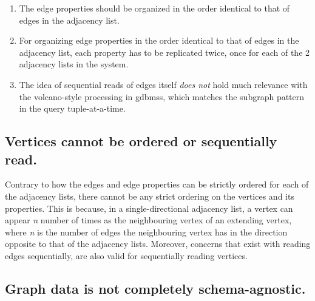 \begin{enumerate}
	
	\item The edge properties should be organized in the order identical to that of edges in the adjacency list.
	
	\item For organizing edge properties in the order identical to that of edges in the adjacency list, each property has to be replicated twice, once for each of the 2 adjacency lists in the system.
	
	\item The idea of sequential reads of edges itself \emph{does not} hold much relevance with the volcano-style processing in \gls{gdbms}s, which matches the subgraph pattern in the query tuple-at-a-time.
	
\end{enumerate}

\subsection{Vertices cannot be ordered or sequentially read.}
\label{ssec:vertices-unordered}

Contrary to how the edges and edge properties can be strictly ordered for each of the adjacency lists, there cannot be any strict ordering on the vertices and its properties. This is because, in a single-directional adjacency list, a vertex can appear \textit{n} number of times as the neighbouring vertex of an extending vertex, where \textit{n} is the number of edges the neighbouring vertex has in the direction opposite to that of the adjacency lists. Moreover, concerns that exist with reading edges sequentially, are also valid for sequentially reading vertices.

\subsection{Graph data is not completely schema-agnostic.}
\label{ssec:graph-schema}

